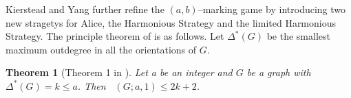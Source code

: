 \documentclass[11pt]{article}
\numberwithin{figure}{section}
\newtheorem{theorem}{Theorem}
\theoremstyle{definition}
\DeclareMathOperator{\col}{col_g}
\begin{document}
    Kierstead and Yang further refine the $(a,b)$--marking game by introducing two new stragetys for Alice, the Harmonious Strategy and the limited Harmonious Strategy. The principle theorem of \cite{kierYang2005} is as follows. Let $\Delta^*(G)$ be the smallest maximum outdegree in all the orientations of $G$.
    
    \begin{theorem}[Theorem 1 in \cite{kierYang2005}]
        Let a be an integer and $G$ be a graph with $\Delta^*(G) = k\leq a$. Then
        $\col(G;a,1) \leq 2k + 2$.
    \end{theorem}
    
%
%        
%    
%    
\end{document}
